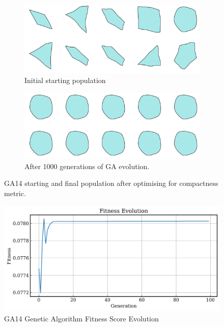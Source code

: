 \documentclass{article}
\begin{document}
\begin{figure}[H]
    \centering
    \begin{subfigure}[b]{0.45\textwidth}
        \centering
        \includegraphics[width=\textwidth]{figures/GAResults/GA14/init_pop10.png}
        \caption{Initial starting population}
        \label{fig:GA14_starting}
    \end{subfigure}
    \hfill
    \begin{subfigure}[b]{0.45\textwidth}
        \centering
        \includegraphics[width=\textwidth]{figures/GAResults/GA14/final_pop10.png}
        \caption{After 1000 generations of GA evolution.}
        \label{fig:GA14_final}
    \end{subfigure}
    \caption{GA14 starting and final population after optimising for compactness metric.}
    \label{fig:GA14_before_after_GA}
\end{figure}

\begin{figure}[H]
    \centering
    \includegraphics[width=0.75\linewidth]{figures/GAResults/GA14/100gen_fitness.png}
    \caption{GA14 Genetic Algorithm Fitness Score Evolution}
    \label{fig:GA14_fitness}
\end{figure}
\end{document}
